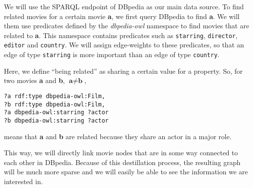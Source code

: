We will use the SPARQL endpoint of DBpedia as our main data source.
To find related movies for a certain movie \textbf{a}, we first query DBpedia to find \textbf{a}.
We will them use predicates defined by the \textit{dbpedia-owl} namespace to find movies that are related to \textbf{a}.
This namespace contains predicates such as \texttt{starring}, \texttt{director}, \texttt{editor} and \texttt{country}.
We will assign edge-weights to these predicates, so that an edge of type \texttt{starring}
is more important than an edge of type \texttt{country}.

Here, we define ``being related'' as sharing a certain value for a property.
So, for two movies \textbf{a} and \textbf{b}, $\textbf{a} \neq \textbf{b}$,

\begin{lstlisting}
?a rdf:type dbpedia-owl:Film,
?b rdf:type dbpedia-owl:Film,
?a dbpedia-owl:starring ?actor
?b dbpedia-owl:starring ?actor
\end{lstlisting}

means that \textbf{a} and \textbf{b} are related because they share an actor in a major role.

This way, we will directly link movie nodes that are in some way connected to each other in DBpedia.
Because of this destillation process, the resulting graph will be much more sparse
and we will easily be able to see the information we are interested in.
